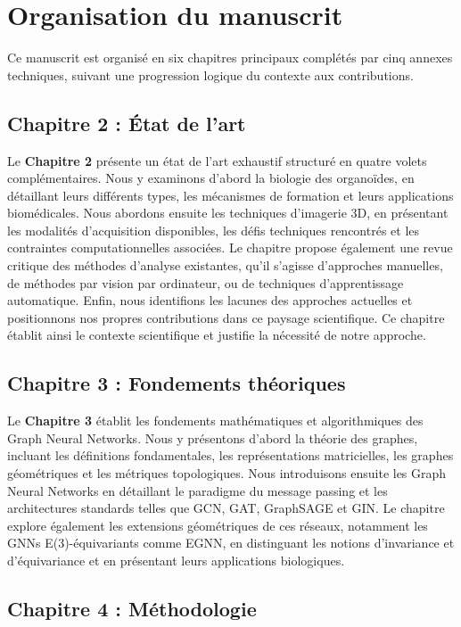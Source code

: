 \section{Organisation du manuscrit}

Ce manuscrit est organisé en six chapitres principaux complétés par cinq annexes techniques, suivant une progression logique du contexte aux contributions.

\subsection{Chapitre 2 : État de l'art}

Le \textbf{Chapitre 2} présente un état de l'art exhaustif structuré en quatre volets complémentaires. Nous y examinons d'abord la biologie des organoïdes, en détaillant leurs différents types, les mécanismes de formation et leurs applications biomédicales. Nous abordons ensuite les techniques d'imagerie 3D, en présentant les modalités d'acquisition disponibles, les défis techniques rencontrés et les contraintes computationnelles associées. Le chapitre propose également une revue critique des méthodes d'analyse existantes, qu'il s'agisse d'approches manuelles, de méthodes par vision par ordinateur, ou de techniques d'apprentissage automatique. Enfin, nous identifions les lacunes des approches actuelles et positionnons nos propres contributions dans ce paysage scientifique. Ce chapitre établit ainsi le contexte scientifique et justifie la nécessité de notre approche.

\subsection{Chapitre 3 : Fondements théoriques}

Le \textbf{Chapitre 3} établit les fondements mathématiques et algorithmiques des Graph Neural Networks. Nous y présentons d'abord la théorie des graphes, incluant les définitions fondamentales, les représentations matricielles, les graphes géométriques et les métriques topologiques. Nous introduisons ensuite les Graph Neural Networks en détaillant le paradigme du message passing et les architectures standards telles que GCN, GAT, GraphSAGE et GIN. Le chapitre explore également les extensions géométriques de ces réseaux, notamment les GNNs E(3)-équivariants comme EGNN, en distinguant les notions d'invariance et d'équivariance et en présentant leurs applications biologiques.

\subsection{Chapitre 4 : Méthodologie}

